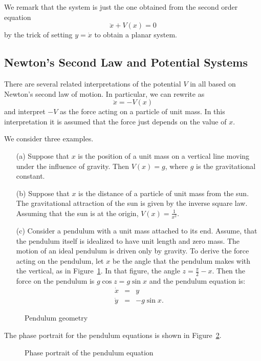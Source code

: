 \documentclass{ximera}
\begin{document}
We remark that the system  is just the one obtained from the 
second order equation 
\begin{equation}  \label{e:V(x)}
\ddot{x} + V(x) = 0
\end{equation}
by the trick of setting $y=\dot{x}$ to obtain a planar system. 

\subsection*{Newton's Second Law and Potential Systems}

There are several related interpretations of the potential $V$ in
 all based on Newton's second law of motion. 
  In particular, we can rewrite  as 
\[
\ddot{x} =  -V(x)
\]
and interpret $-V$ as the force acting on a 
particle of unit mass.  In this 
interpretation it is assumed that the force just depends on the value of $x$. 

We consider three examples.
\begin{itemize}
\item[(a)] Suppose that $x$ is the position of a unit mass on a vertical 
line moving under the influence of gravity.  Then $V(x)=g$, where 
$g$ is the gravitational constant.
\item[(b)] Suppose that $x$ is the distance of a particle of unit mass from 
the sun.  The gravitational attraction of the sun is given by the inverse
square law. Assuming that the sun is at the origin, $V(x)= \frac{1}{x^2}$.
\item[(c)] Consider a pendulum 
with a unit mass attached to its end.  Assume, 
that the pendulum itself is idealized to have unit length and zero mass.  
The motion of an ideal pendulum is driven only by gravity. To derive the 
force acting on the pendulum, let $x$ be the angle that the pendulum makes 
with the vertical, as in Figure~\ref{F:pendulum}.  In that figure, the angle
$z=\frac{\pi}{2}-x$.  Then the force on the pendulum is $g\cos z=g\sin x$ 
and the pendulum equation is:
\begin{equation*} \label{e:pendulum}
\begin{array}{rcl} 
\dot{x} & = & y \\
\dot{y} & = & -g\sin x. 
\end{array}
\end{equation*}
\end{itemize}
\begin{figure}[htb]
           \centerline{%
	   }
           \caption{Pendulum geometry}
           \label{F:pendulum}
\end{figure}
The phase portrait for the pendulum equations is shown in Figure~\ref{F:ppen}.
\begin{figure}[htb]
           \centerline{%
	   }
           \caption{Phase portrait of the pendulum equation 
		\protect{}}
           \label{F:ppen}
\end{figure}
\end{document}

